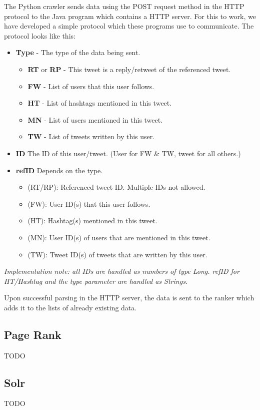 \documentclass[12pt,a4paper]{article}
\begin{document}
The Python crawler sends data using the POST request method in the HTTP protocol to the Java program which contains a HTTP server. For this to work, we have developed a simple protocol which these programs use to communicate. The protocol looks like this:

\begin{itemize}
	\item \textbf{Type} - The type of the data being sent.
	\begin{itemize}
		\item \textbf{RT} or \textbf{RP} - This tweet is a reply/retweet of the referenced tweet.
		\item \textbf{FW} - List of users that this user follows.
		\item \textbf{HT} - List of hashtags mentioned in this tweet.
		\item \textbf{MN} - List of users mentioned in this tweet.
		\item \textbf{TW} - List of tweets written by this user.
	\end{itemize}
	\item \textbf{ID} The ID of this user/tweet. (User for FW \& TW, tweet for all others.)
	\item \textbf{refID} Depends on the type.
	\begin{itemize}
		\item[] (RT/RP): Referenced tweet ID. Multiple IDs not allowed.
		\item[] (FW): User ID(s) that this user follows.
		\item[] (HT): Hashtag(s) mentioned in this tweet.
		\item[] (MN): User ID(s) of users that are mentioned in this tweet.
		\item[] (TW): Tweet ID(s) of tweets that are written by this user.
	\end{itemize}
\end{itemize}

\textit{Implementation note: all IDs are handled as numbers of type Long. refID for HT/Hashtag and the type parameter are handled as Strings.}

Upon successful parsing in the HTTP server, the data is sent to the ranker which adds it to the lists of already existing data.

\subsection{Page Rank}
TODO
\subsection{Solr}
TODO
\end{document}
